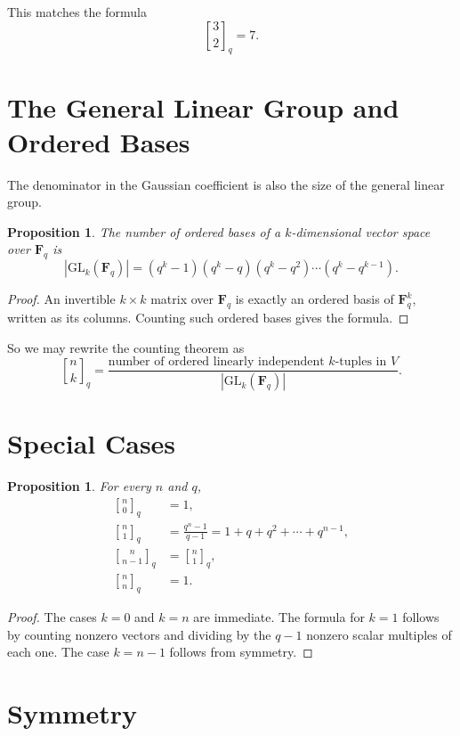 \documentclass[11pt]{article}
\newtheorem{proposition}[theorem]{Proposition}
\theoremstyle{definition}
\theoremstyle{remark}
\newcommand{\F}{\mathbf{F}}
\newcommand{\GL}{\mathrm{GL}}
\newcommand{\qbinom}[2]{\genfrac{[}{]}{0pt}{}{#1}{#2}_q}
\begin{document}
	This matches the formula
	\[
	\qbinom{3}{2}=7.
	\]
	
	\section{The General Linear Group and Ordered Bases}
	
	The denominator in the Gaussian coefficient is also the size of the general linear group.
	
	\begin{proposition}
		The number of ordered bases of a \(k\)-dimensional vector space over \(\F_q\) is
		\[
		|\GL_k(\F_q)|
		=
		(q^k-1)(q^k-q)(q^k-q^2)\cdots(q^k-q^{k-1}).
		\]
	\end{proposition}
	
	\begin{proof}
		An invertible \(k\times k\) matrix over \(\F_q\) is exactly an ordered basis of \(\F_q^k\), written as its columns. Counting such ordered bases gives the formula.
	\end{proof}
	
	So we may rewrite the counting theorem as
	\[
	\qbinom{n}{k}
	=
	\frac{\text{number of ordered linearly independent \(k\)-tuples in \(V\)}}{|\GL_k(\F_q)|}.
	\]
	
	\section{Special Cases}
	
	\begin{proposition}
		For every \(n\) and \(q\),
		\begin{align*}
			\qbinom{n}{0} &= 1,\\
			\qbinom{n}{1} &= \frac{q^n-1}{q-1}=1+q+q^2+\cdots+q^{n-1},\\
			\qbinom{n}{n-1} &= \qbinom{n}{1},\\
			\qbinom{n}{n} &= 1.
		\end{align*}
	\end{proposition}
	
	\begin{proof}
		The cases \(k=0\) and \(k=n\) are immediate. The formula for \(k=1\) follows by counting nonzero vectors and dividing by the \(q-1\) nonzero scalar multiples of each one. The case \(k=n-1\) follows from symmetry.
	\end{proof}
	
	\section{Symmetry}
	
\end{document}
